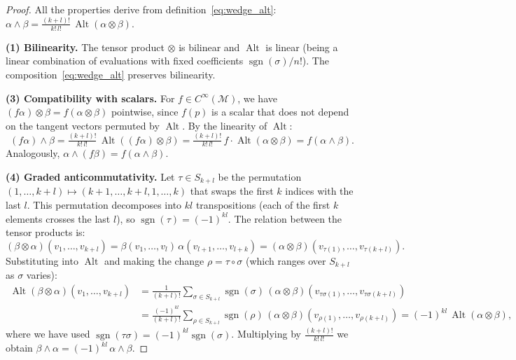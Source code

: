 \begin{proof}
All the properties derive from definition~\eqref{eq:wedge_alt}: $\alpha \wedge \beta = \frac{(k+l)!}{k!\,l!}\, \operatorname{Alt}(\alpha \otimes \beta)$.

\textbf{(1) Bilinearity.} The tensor product $\otimes$ is bilinear and $\operatorname{Alt}$ is linear (being a linear combination of evaluations with fixed coefficients $\operatorname{sgn}(\sigma)/n!$). The composition~\eqref{eq:wedge_alt} preserves bilinearity.

\textbf{(3) Compatibility with scalars.} For $f \in C^\infty(\mathcal{M})$, we have $(f\alpha) \otimes \beta = f(\alpha \otimes \beta)$ pointwise, since $f(p)$ is a scalar that does not depend on the tangent vectors permuted by $\operatorname{Alt}$. By the linearity of $\operatorname{Alt}$:
\[
(f\alpha) \wedge \beta = \tfrac{(k+l)!}{k!\,l!}\,\operatorname{Alt}((f\alpha) \otimes \beta) = \tfrac{(k+l)!}{k!\,l!}\,f\cdot\operatorname{Alt}(\alpha \otimes \beta) = f(\alpha \wedge \beta).
\]
Analogously, $\alpha \wedge (f\beta) = f(\alpha \wedge \beta)$.

\textbf{(4) Graded anticommutativity.} Let $\tau \in S_{k+l}$ be the permutation $(1, \ldots, k+l) \mapsto (k{+}1, \ldots, k{+}l, 1, \ldots, k)$ that swaps the first $k$ indices with the last $l$. This permutation decomposes into $kl$ transpositions (each of the first $k$ elements crosses the last $l$), so $\operatorname{sgn}(\tau) = (-1)^{kl}$. The relation between the tensor products is:
\[
(\beta \otimes \alpha)(v_1, \ldots, v_{k+l}) = \beta(v_1, \ldots, v_l)\,\alpha(v_{l+1}, \ldots, v_{l+k}) = (\alpha \otimes \beta)(v_{\tau(1)}, \ldots, v_{\tau(k+l)}).
\]
Substituting into $\operatorname{Alt}$ and making the change $\rho = \tau \circ \sigma$ (which ranges over $S_{k+l}$ as $\sigma$ varies):
\begin{align*}
\operatorname{Alt}(\beta \otimes \alpha)(v_1, \ldots, v_{k+l})
  &= \frac{1}{(k{+}l)!}\sum_{\sigma \in S_{k+l}} \operatorname{sgn}(\sigma)\,(\alpha \otimes \beta)(v_{\tau\sigma(1)}, \ldots, v_{\tau\sigma(k+l)}) \\
  &= \frac{(-1)^{kl}}{(k{+}l)!}\sum_{\rho \in S_{k+l}} \operatorname{sgn}(\rho)\,(\alpha \otimes \beta)(v_{\rho(1)}, \ldots, v_{\rho(k+l)})
  = (-1)^{kl}\,\operatorname{Alt}(\alpha \otimes \beta),
\end{align*}
where we have used $\operatorname{sgn}(\tau\sigma) = (-1)^{kl}\operatorname{sgn}(\sigma)$. Multiplying by $\frac{(k+l)!}{k!\,l!}$ we obtain $\beta \wedge \alpha = (-1)^{kl}\,\alpha \wedge \beta$.


\end{proof}
